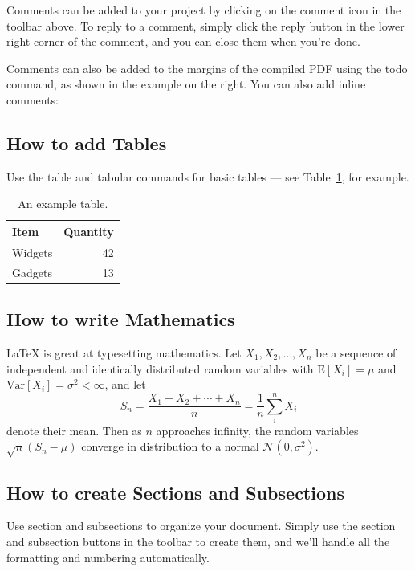 \documentclass[a4paper]{article}
\begin{document}
Comments can be added to your project by clicking on the comment icon in the toolbar above. %
%
%
To reply to a comment, simply click the reply button in the lower right corner of the comment, and you can close them when you're done.

Comments can also be added to the margins of the compiled PDF using the todo command, as shown in the example on the right. You can also add inline comments:


\subsection{How to add Tables}

Use the table and tabular commands for basic tables --- see Table~\ref{tab:widgets}, for example. 

\begin{table}
\centering
\begin{tabular}{l|r}
Item & Quantity \\\hline
Widgets & 42 \\
Gadgets & 13
\end{tabular}
\caption{\label{tab:widgets}An example table.}
\end{table}

\subsection{How to write Mathematics}

\LaTeX{} is great at typesetting mathematics. Let $X_1, X_2, \ldots, X_n$ be a sequence of independent and identically distributed random variables with $\text{E}[X_i] = \mu$ and $\text{Var}[X_i] = \sigma^2 < \infty$, and let
\[S_n = \frac{X_1 + X_2 + \cdots + X_n}{n}
      = \frac{1}{n}\sum_{i}^{n} X_i\]
denote their mean. Then as $n$ approaches infinity, the random variables $\sqrt{n}(S_n - \mu)$ converge in distribution to a normal $\mathcal{N}(0, \sigma^2)$.


\subsection{How to create Sections and Subsections}

Use section and subsections to organize your document. Simply use the section and subsection buttons in the toolbar to create them, and we'll handle all the formatting and numbering automatically.
\end{document}
